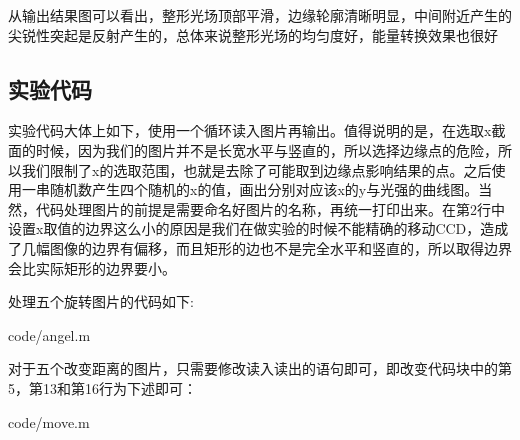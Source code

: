 \documentclass[UTF8]{ctexart}
\begin{document}
从输出结果图可以看出，整形光场顶部平滑，边缘轮廓清晰明显，中间附近产生的尖锐性突起是反射产生的，总体来说整形光场的均匀度好，能量转换效果也很好
	\subsection{实验代码}
实验代码大体上如下，使用一个循环读入图片再输出。值得说明的是，在选取x截面的时候，因为我们的图片并不是长宽水平与竖直的，所以选择边缘点的危险，所以我们限制了x的选取范围，也就是去除了可能取到边缘点影响结果的点。之后使用一串随机数产生四个随机的x的值，画出分别对应该x的y与光强的曲线图。当然，代码处理图片的前提是需要命名好图片的名称，再统一打印出来。在第2行中设置x取值的边界这么小的原因是我们在做实验的时候不能精确的移动CCD，造成了几幅图像的边界有偏移，而且矩形的边也不是完全水平和竖直的，所以取得边界会比实际矩形的边界要小。
	
处理五个旋转图片的代码如下:
		
		{code/angel.m}
	
对于五个改变距离的图片，只需要修改读入读出的语句即可，即改变代码块中的第5，第13和第16行为下述即可：
		
		{code/move.m}
\end{document}
